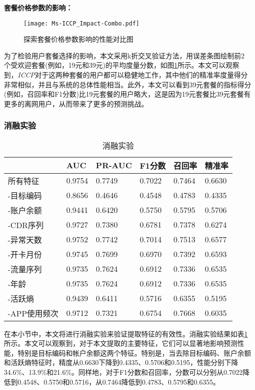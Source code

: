 \textbf{套餐价格参数的影响：}
\begin{figure}[hbt]
	\centering
	\texttt{[image: Ms-ICCP\_Impact-Combo.pdf]}
	\caption{探索套餐价格参数影响的性能对比图}
	\label{Fig:Impact-Combo}
\end{figure}
为了检验用户套餐选择的影响，本文采用k折交叉验证方法，用误差条图绘制前2个受欢迎套餐(例如，19元和39元)的平均度量分数，如图\ref{Fig:Impact-Combo}所示。本文可以观察到，\emph{ICCP}对于这两种套餐的用户都可以稳健地工作，其中他们的精准率度量得分非常相似，并且与系统的总体性能相当。此外，本文可以看到39元套餐的指标得分(例如，召回率和F1分数)比19元套餐的用户略大，这是因为19元套餐比39元套餐有更多的离网用户，从而带来了更多的预测挑战。%


\subsubsection{消融实验}
\begin{table}[!htb]
	\centering
	\caption{消融实验}
	\label{Table:Ablation}
	\begin{tabular}{llllll}
		\toprule
		& AUC  & PR-AUC  & F1分数  & 召回率  & 精准率 \\
		\midrule 
		\midrule
		所有特征 	& 0.9754 & 0.7749 & 0.7022 & 0.7464 & 0.6630	\\
		-目标编码 	& 0.8656 & 0.4646 & 0.4548	& 0.4783 & 0.4335 	\\
		-账户余额 	& 0.9441 & 0.6420 & 0.5750	& 0.5795 & 0.5706	\\
		-CDR序列 	& 0.9727 & 0.7380 & 0.6781 & 0.7378 & 0.6274	\\
		-异常天数 	& 0.9752 & 0.7742 & 0.7014 & 0.7513 & 0.6577	\\
		-开卡月份 	 & 0.9745 & 0.7699 & 0.6970 & 0.7392 & 0.6593	\\
		-流量序列 	& 0.9735 & 0.7624 & 0.6912		& 0.7336 & 0.6535	\\
		-年龄 	& 0.9735 & 0.7624 & 0.6912	& 0.7336 & 0.6535	\\
		-活跃熵 	& 0.9439 & 0.6411 & 0.5716 & 0.6355 & 0.5195	\\
		-APP使用频次 & 0.9712 & 0.7321 & 0.6754	& 0.7668 & 0.6035	\\
		\midrule 
		\bottomrule	
	\end{tabular}
\end{table}

在本小节中，本文将进行消融实验来验证提取特征的有效性。消融实验结果如表\ref{Table:Ablation}所示。本文可以观察到，对于本文提取的主要特征，它们可以显著地影响预测性能，特别是目标编码和帐户余额这两个特征。特别是，当去除目标编码、账户余额和活跃熵特征时，精度从0.6630下降到0.4335、0.5706和0.5195，性能分别下降34.6\%、13.9\%和21.6\%。同样地，对于F1分数和召回率，分数可以分别从0.7022降低到0.4548、0.5750和0.5716，从0.7464降低到0.4783、0.5795和0.6355。

